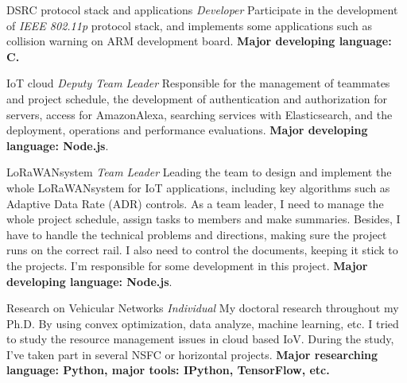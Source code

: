 \documentclass[10pt]{article} %
\begin{document}
\begin{paracol}{2}
{} %
{DSRC protocol stack and applications} %
{\textit{Developer}} %
{Participate in the development of \textit{IEEE 802.11p} protocol stack, and implements some applications such as collision warning on ARM development board. \textbf{Major developing language: C.}} %


{} %
{IoT cloud} %
{\textit{Deputy Team Leader}} %
{Responsible for the management of teammates and project schedule, the development of authentication and authorization for servers, access for Amazon\faAmazon Alexa, searching services with Elasticsearch, and the deployment, operations and performance evaluations. \textbf{Major developing language: Node.js}.}  %


{} %
{LoRaWAN\texttrademark system} %
{\textit{Team Leader}} %
{Leading the team to design and implement the whole LoRaWAN\texttrademark system for IoT applications, including key algorithms such as Adaptive Data Rate (ADR) controls. As a team leader, I need to manage the whole project schedule, assign tasks to members and make summaries. Besides, I have to handle the technical problems and directions, making sure the project runs on the correct rail. I also need to control the documents, keeping it stick to the projects. I'm responsible for some development in this project. \textbf{Major developing language: Node.js}.} %


{} %
{Research on Vehicular Networks} %
{\textit{Individual}} %
{My doctoral research throughout my Ph.D. By using convex optimization, data analyze, machine learning, etc. I tried to study the resource management issues in cloud based IoV. During the study, I've taken part in several NSFC or horizontal projects. \textbf{Major researching language: Python, major tools: IPython, TensorFlow, etc.}} %

\vspace{-\baselineskip}\medskip %



\end{paracol}
\end{document}
